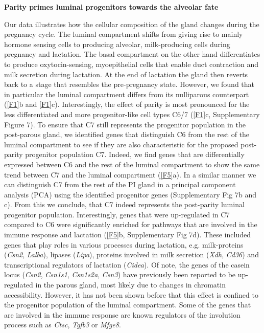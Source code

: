 \documentclass[titlepage, 12pt, oneside]{amsart}
\begin{document}
\textbf{Parity primes luminal progenitors towards the alveolar fate}

Our data illustrates how the cellular composition of the gland changes during the pregnancy cycle.
The luminal compartment shifts from giving rise to mainly hormone sensing cells to producing alveolar, milk-producing cells during pregnancy and lactation. 
The basal compartment on the other hand differentiates to produce oxytocin-sensing, myoepithelial cells that enable duct contraction and milk secretion during lactation.
At the end of lactation the gland then reverts back to a stage that resembles the pre-pregnancy state.
However, we found that in particular the luminal compartment differs from its nulliparous counterpart (\autoref{F1}b and \autoref{F1}c).
Interestingly, the effect of parity is most pronounced for the less differentiated and more progenitor-like cell types C6/7 (\autoref{F1}c, Supplementary Figure 7).
To ensure that C7 still represents the progenitor population in the post-parous gland, we identified genes that distinguish C6 from the rest of the luminal compartment to see if they are also characteristic for the proposed post-parity progenitor population C7.
Indeed, we find genes that are differentially expressed between C6 and the rest of the luminal compartment to show the same trend between C7 and the luminal compartment (\autoref{F5}a).
In a similar manner we can distinguish C7 from the rest of the PI gland in a principal component analysis (PCA) using the identified progenitor genes (Supplementary Fig 7b and c).
From this we conclude, that C7 indeed represents the post-parity luminal progenitor population.
Interestingly, genes that were up-regulated in C7 compared to C6 were significantly enriched for pathways that are involved in the immune response and lactation (\autoref{F5}b, Supplementary Fig 7d).
These included genes that play roles in various processes during lactation, e.g. milk-proteins (\textit{Csn2}, \textit{Lalba}), lipases (\textit{Lipa}), proteins involved in milk secretion (\textit{Xdh}, \textit{Cd36}) and transcriptional regulators of lactation (\textit{Cidea})\autocite{Wang2012}.
Of note, the genes of the casein locus (\textit{Csn2}, \textit{Csn1s1}, \textit{Csn1s2a}, \textit{Csn3}) have previously been reported to be up-regulated in the parous gland, most likely due to changes in chromatin accessibility\autocite{Dos2015,Rijnkels2013}.
However, it has not been shown before that this effect is confined to the progenitor population of the luminal compartment.
Some of the genes that are involved in the immune response are known regulators of the involution process such as \textit{Ctsc}, \textit{Tgfb3} or \textit{Mfge8}\autocite{Clarkson2003}.
\end{document}
